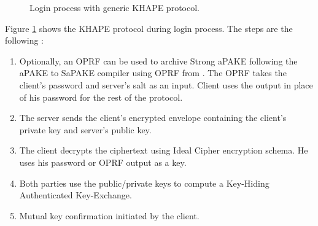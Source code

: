 \documentclass[../report.tex]{subfiles}
\begin{document}
\begin{figure}[h]
 \centering
 
 \setlength{\fboxsep}{10pt}
 \setlength{\fboxrule}{1pt}
 
 \caption{Login process with generic KHAPE protocol.}
 \label{fig:Generic_KHAPE}
\end{figure}

Figure \ref{fig:Generic_KHAPE} shows the KHAPE protocol during login process.
The steps are the following :

\begin{enumerate}
 \item Optionally, an OPRF can be used to archive Strong aPAKE following the aPAKE to SaPAKE compiler using OPRF from \cite{OPAQUE_Paper}. The OPRF takes the client's password and server's salt as an input. Client uses the output in place of his password for the rest of the protocol.
 \item The server sends the client's encrypted envelope containing the client's private key and server's public key.
 \item The client decrypts the ciphertext using Ideal Cipher encryption schema. He uses his password or OPRF output as a key.
 \item Both parties use the public/private keys to compute a Key-Hiding Authenticated Key-Exchange.
 \item Mutual key confirmation initiated by the client.
\end{enumerate}

\paragraph{}
\end{document}
